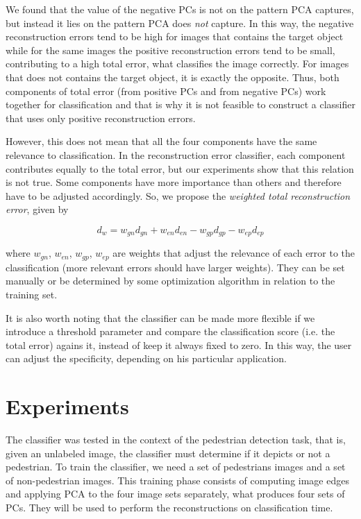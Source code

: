\documentclass[10pt, conference, compsocconf]{IEEEtran}
\begin{document}
We found that the value of the negative PCs is not on the pattern PCA captures, but instead it lies on the pattern PCA does \emph{not} capture. In this way, the negative reconstruction errors tend to be high for images that contains the target object while for the same images the positive reconstruction errors tend to be small, contributing to a high total error, what classifies the image correctly. For images that does not contains the target object, it is exactly the opposite. Thus, both components of total error (from positive PCs and from negative PCs) work together for classification and that is why it is not feasible to construct a classifier that uses only positive reconstruction errors.

However, this does not mean that all the four components have the same relevance to classification. In the reconstruction error classifier, each component contributes equally to the total error, but our experiments show that this relation is not true. Some components have more importance than others and therefore have to be adjusted accordingly. So, we propose the \emph{weighted total reconstruction error}, given by

\begin{equation}
  d_w = w_{gn} d_{gn} + w_{en} d_{en} - w_{gp} d_{gp} - w_{ep} d_{ep}
  \label{weighted_total_error}
\end{equation}

\noindent where $w_{gn}$, $w_{en}$, $w_{gp}$, $w_{ep}$ are weights that adjust the relevance of each error to the classification (more relevant errors should have larger weights). They can be set manually or be determined by some optimization algorithm in relation to the training set.

It is also worth noting that the classifier can be made more flexible if we introduce a threshold parameter and compare the classification score (i.e. the total error) agains it, instead of keep it always fixed to zero. In this way, the user can adjust the specificity, depending on his particular application.


\section{Experiments}

The classifier was tested in the context of the pedestrian detection task, that is, given an unlabeled image, the classifier must determine if it depicts or not a pedestrian. To train the classifier, we need a set of pedestrians images and a set of non-pedestrian images. This training phase consists of computing image edges and applying PCA to the four image sets separately, what produces four sets of PCs. They will be used to perform the reconstructions on classification time.
\end{document}
